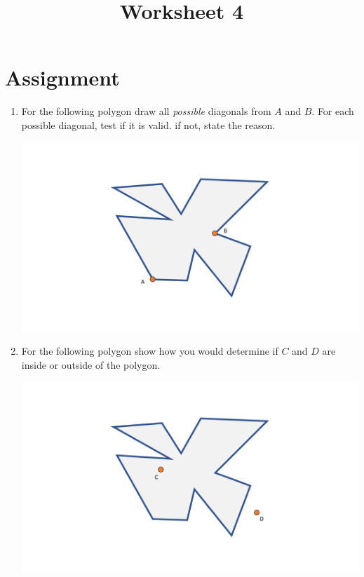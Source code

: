 \documentclass[a4paper,12pt]{article}
\title{Worksheet 4}
\begin{document}
\maketitle

\worksheetGroundRules

\worksheetSubmission

\vspace{5pt}
\section{Assignment}

\begin{enumerate}


\item For the following polygon draw all \textit{possible} diagonals from $A$ and $B$. For each possible diagonal, test if it is valid. if not, state the reason. 

\vspace{20pt}
\begin{center}
\includegraphics[width=0.8\linewidth]{../images/diagonals.pdf}
\end{center}


\newpage

\item For the following polygon show how you would determine if $C$ and $D$ are inside or outside of the polygon.

\vspace{20pt}
\begin{center}
\includegraphics[width=0.7\linewidth]{../images/point_in_poly.pdf}
\end{center}


\end{enumerate}
\end{document}
